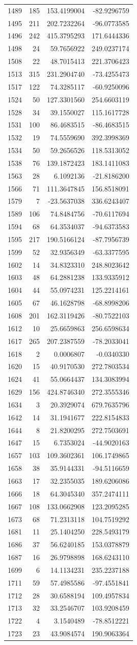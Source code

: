 \documentclass[
]{article}
\begin{document}
\begin{longtable}[]{@{}lrrr@{}}
1489 & 185 & 153.4199004 & -82.9296759\tabularnewline
1495 & 211 & 202.7232264 & -96.0773585\tabularnewline
1496 & 242 & 415.3795293 & 171.6444336\tabularnewline
1498 & 24 & 59.7656922 & 249.0237174\tabularnewline
1508 & 22 & 48.7015413 & 221.3706423\tabularnewline
1513 & 315 & 231.2904740 & -73.4255473\tabularnewline
1517 & 122 & 74.3285117 & -60.9250096\tabularnewline
1524 & 50 & 127.3301560 & 254.6603119\tabularnewline
1528 & 34 & 39.1550027 & 115.1617728\tabularnewline
1531 & 100 & 86.4683515 & -86.4683515\tabularnewline
1532 & 19 & 74.5559690 & 392.3998369\tabularnewline
1534 & 50 & 59.2656526 & 118.5313052\tabularnewline
1538 & 76 & 139.1872423 & 183.1411083\tabularnewline
1563 & 28 & 6.1092136 & -21.8186200\tabularnewline
1566 & 71 & 111.3647845 & 156.8518091\tabularnewline
1579 & 7 & -23.5637038 & 336.6243407\tabularnewline
1589 & 106 & 74.8484756 & -70.6117694\tabularnewline
1594 & 68 & 64.3534037 & -94.6373583\tabularnewline
1595 & 217 & 190.5166124 & -87.7956739\tabularnewline
1599 & 52 & 32.9356349 & -63.3377595\tabularnewline
1602 & 14 & 34.8323310 & 248.8023642\tabularnewline
1603 & 48 & 64.2881238 & 133.9335912\tabularnewline
1604 & 44 & 55.0974231 & 125.2214161\tabularnewline
1605 & 67 & 46.1628798 & -68.8998206\tabularnewline
1608 & 201 & 162.3119426 & -80.7522103\tabularnewline
1612 & 10 & 25.6659863 & 256.6598634\tabularnewline
1617 & 265 & 207.2387559 & -78.2033041\tabularnewline
1618 & 2 & 0.0006807 & -0.0340330\tabularnewline
1620 & 15 & 40.9170530 & 272.7803534\tabularnewline
1624 & 41 & 55.0664437 & 134.3083994\tabularnewline
1629 & 156 & 424.8746340 & 272.3555346\tabularnewline
1634 & 3 & 20.3929074 & 679.7635796\tabularnewline
1642 & 14 & 31.1941677 & 222.8154833\tabularnewline
1644 & 8 & 21.8200295 & 272.7503691\tabularnewline
1647 & 15 & 6.7353024 & -44.9020163\tabularnewline
1657 & 103 & 109.3602361 & 106.1749865\tabularnewline
1658 & 38 & 35.9144331 & -94.5116659\tabularnewline
1663 & 17 & 32.2355035 & 189.6206086\tabularnewline
1666 & 18 & 64.3045340 & 357.2474111\tabularnewline
1667 & 108 & 133.0662908 & 123.2095285\tabularnewline
1673 & 68 & 71.2313118 & 104.7519292\tabularnewline
1681 & 11 & 25.1404250 & 228.5493179\tabularnewline
1686 & 37 & 56.6240185 & 153.0378879\tabularnewline
1687 & 16 & 26.9798898 & 168.6243110\tabularnewline
1699 & 6 & 14.1134231 & 235.2237188\tabularnewline
1711 & 59 & 57.4985586 & -97.4551841\tabularnewline
1712 & 28 & 30.6588194 & 109.4957834\tabularnewline
1713 & 32 & 33.2546707 & 103.9208459\tabularnewline
1722 & 4 & 3.1540489 & -78.8512221\tabularnewline
1723 & 23 & 43.9084574 & 190.9063364\tabularnewline

\end{longtable}
\end{document}
